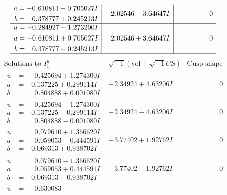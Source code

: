 \documentclass[1p]{elsarticle_modified}
\theoremstyle{definition}
\newcommand{\I}{\sqrt{-1}}
\begin{document}
$$\begin{array}{c|c|c}
\begin{aligned}
a &= -0.610811 - 0.705027 I \\
b &= \phantom{-}0.378777 + 0.245213 I\end{aligned}
 & \phantom{-}2.02546 - 3.64647 I & \phantom{-0.000000 } 0 \\ \hline\begin{aligned}
u &= -0.284927 - 1.273200 I \\
a &= -0.610811 + 0.705027 I \\
b &= \phantom{-}0.378777 - 0.245213 I\end{aligned}
 & \phantom{-}2.02546 + 3.64647 I & \phantom{-0.000000 } 0\\
 \hline 
 \end{array}$$\newpage$$\begin{array}{c|c|c}  
\text{Solutions to }I^u_{1}& \I (\text{vol} + \sqrt{-1}CS) & \text{Cusp shape}\\
 \hline 
\begin{aligned}
u &= \phantom{-}0.425694 + 1.274300 I \\
a &= -0.137225 + 0.299114 I \\
b &= \phantom{-}0.804888 + 0.001080 I\end{aligned}
 & -2.34924 + 4.63206 I & \phantom{-0.000000 } 0 \\ \hline\begin{aligned}
u &= \phantom{-}0.425694 - 1.274300 I \\
a &= -0.137225 - 0.299114 I \\
b &= \phantom{-}0.804888 - 0.001080 I\end{aligned}
 & -2.34924 - 4.63206 I & \phantom{-0.000000 } 0 \\ \hline\begin{aligned}
u &= \phantom{-}0.079610 + 1.366620 I \\
a &= \phantom{-}0.059053 - 0.444591 I \\
b &= -0.069313 + 0.938702 I\end{aligned}
 & -3.77402 + 1.92762 I & \phantom{-0.000000 } 0 \\ \hline\begin{aligned}
u &= \phantom{-}0.079610 - 1.366620 I \\
a &= \phantom{-}0.059053 + 0.444591 I \\
b &= -0.069313 - 0.938702 I\end{aligned}
 & -3.77402 - 1.92762 I & \phantom{-0.000000 } 0 \\ \hline\begin{aligned}
u &= \phantom{-}0.630083\phantom{ +0.000000I} \\

\end{aligned}
\end{array}$$
\end{document}
